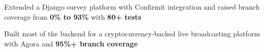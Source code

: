 \begin{cvitems}
  \item Extended a Django survey platform with Confirmit integration and raised branch coverage from \textbf{0\% to 93\%} with \textbf{80+ tests}
\end{cvitems}

\begin{cvitems}
  \item Built most of the backend for a cryptocurrency-backed live broadcasting platform with Agora and \textbf{95\%+ branch coverage}
\end{cvitems}
